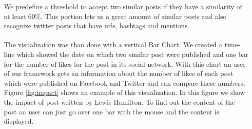 We predefine a threshold to accept two similar posts if they have a similarity of at least $60\%$. This portion lets us a great amount of similar posts and also recognize twitter posts that have urls, hashtags and mentions. \\
~\\
The visualization was than done with a vertical Bar Chart. We created a time-line which showed the date on which two similar post were published and one bar for the number of likes for the post in its social network. With this chart an user of our framework gets an information about the number of likes of each post which were published on Facebook and Twitter and can compare these numbers. Figure \ref{fig:impact} shows an example of this visualization. In this figure we show the impact of post written by Lewis Hamilton. To find out the content of the post an user can just go over one bar with the mouse and the content is displayed. 

